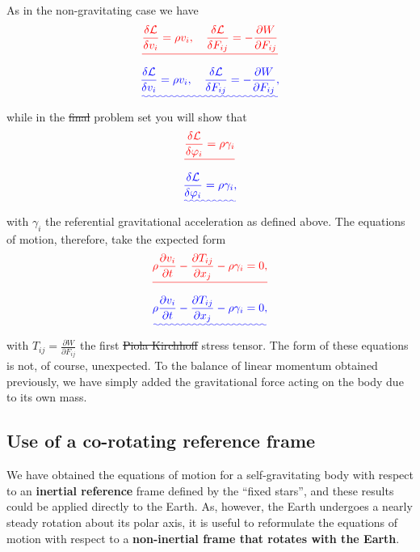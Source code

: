 \documentclass[a4paper,12pt]{paper}
\providecommand{\DIFadd}[1]{{\protect\color{blue}\uwave{#1}}} %
\providecommand{\DIFdel}[1]{{\protect\color{red}\sout{#1}}}                      %
\providecommand{\DIFaddbegin}{} %
\providecommand{\DIFaddend}{} %
\providecommand{\DIFdelbegin}{} %
\providecommand{\DIFdelend}{} %
\begin{document}
As in the non-gravitating case we have
\DIFdelbegin \begin{displaymath}
\DIFdel{\frac{\delta\mathcal{L}}{\delta v_{i}}=\rho v_{i}, \quad \frac{\delta\mathcal{L}}{\delta F_{ij}}=-\frac{\partial W}{\partial F_{ij}}
}\end{displaymath}%
\DIFdelend \DIFaddbegin \begin{equation}
\DIFadd{\frac{\delta\mathcal{L}}{\delta v_{i}}=\rho v_{i},\quad \frac{\delta\mathcal{L}}{\delta F_{ij}}=-\frac{\partial W}{\partial F_{ij}},
\label{eq:26}
}\end{equation}\DIFaddend 
while in the \DIFdelbegin \DIFdel{final }\DIFdelend \DIFaddbegin \DIFadd{second }\DIFaddend problem set you will show that
\DIFdelbegin \begin{displaymath}
\DIFdel{\frac{\delta\mathcal{L}}{\delta\varphi_{i}}=\rho\gamma_{i}
}\end{displaymath}%
\DIFdelend \DIFaddbegin \begin{equation}
\DIFadd{\frac{\delta\mathcal{L}}{\delta\varphi_{i}}=\rho\gamma_{i},
\label{eq:27}
}\end{equation}\DIFaddend 
with $\gamma_{i}$ the referential gravitational acceleration as defined above. The equations of motion, therefore, take the expected form
\DIFdelbegin \begin{displaymath}
\DIFdel{\rho\frac{\partial v_{i}}{\partial t}-\frac{\partial T_{ij}}{\partial x_{j}}-\rho\gamma_{i}=0,
}\end{displaymath}%
\DIFdelend \DIFaddbegin \begin{equation}
\DIFadd{\rho\frac{\partial v_{i}}{\partial t}-\frac{\partial T_{ij}}{\partial x_{j}}-\rho\gamma_{i}=0,
\label{eq:28}
}\end{equation}\DIFaddend 
with $T_{ij}=\frac{\partial W}{\partial F_{ij}}$ the first \DIFdelbegin \DIFdel{Piola Kirchhoff }\DIFdelend \DIFaddbegin \DIFadd{Piola--Kirchhoff }\DIFaddend stress tensor. The form 
of these equations is not, of course, unexpected. To the balance of linear momentum obtained previously, 
we have simply added the gravitational force acting on the body due to its own mass.

\subsection*{Use of a co-rotating reference frame}
We have obtained the equations of motion for a self-gravitating body with respect to an \textbf{inertial reference} 
frame defined by the ``fixed stars'', and these results could be applied directly to the Earth. As, however, 
the Earth undergoes a nearly steady rotation about its polar axis, it is useful to reformulate the equations 
of motion with respect to a \textbf{non-inertial frame that rotates with the Earth}.
\end{document}
